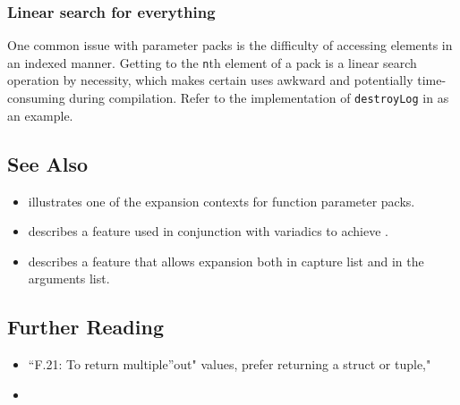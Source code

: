 \subsubsection[Linear search for everything]{Linear search for everything}\label{linear-search-for-everything}

One common issue with parameter packs is the difficulty of accessing
elements in an indexed manner. Getting to the \lstinline!n!th element of a
pack is a linear search operation by necessity, which makes certain uses
awkward and potentially time-consuming during compilation. Refer to the
implementation of \lstinline!destroyLog! in  as an example.

\subsection[See Also]{See Also}\label{see-also}

\begin{itemize}
\item{ illustrates one of the expansion contexts for function parameter packs.}
\item{ describes a feature used in conjunction with variadics to achieve .}
\item{ describes a feature that allows expansion both in capture list and in the arguments list.}
\end{itemize}

\subsection[Further Reading]{Further Reading}\label{further-reading}

\begin{itemize}
\item{``F.21: To return multiple''out" values, prefer returning a struct or tuple," \cite{stroustrup20}}
\item{\cite{vandevoorde18}}
\end{itemize}


